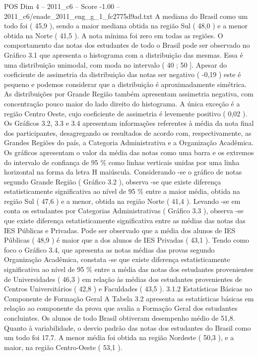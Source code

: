 \begin{textsample}{POS Dim 4 – 2011\_c6 – Score -1.00 – 2011\_c6/enade\_2011\_eng\_g\_1\_fc2775d9ad.txt}
A mediana do Brasil como um todo foi ( 45,9 ), sendo a maior mediana obtida na região Sul ( 48,0 ) e a menor obtida na Norte ( 41,5 ).
A nota mínima foi zero em todas as regiões.
O comportamento das notas dos estudantes de todo o Brasil pode ser observado no Gráfico 3.1 que apresenta o histograma com a distribuição das mesmas.
Essa é uma distribuição unimodal, com moda no intervalo ( 40 ; 50 ].
Apesar do coeficiente de assimetria da distribuição das notas ser negativo ( -0,19 ) este é pequeno e podemos considerar que a distribuição é aproximadamente simétrica.
As distribuições por Grande Região também apresentam assimetria negativa, com concentração pouco maior do lado direito do histograma.
A única exceção é a região Centro Oeste, cujo coeficiente de assimetria é levemente positivo ( 0,02 ).
Os Gráficos 3.2, 3.3 e 3.4 apresentam informações referentes à média da nota final dos participantes, desagregando os resultados de acordo com, respectivamente, as Grandes Regiões do país, a Categoria Administrativa e a Organização Acadêmica.
Os gráficos apresentam o valor da média das notas como uma barra e os extremos do intervalo de confiança de 95 \% como linhas verticais unidas por uma linha horizontal na forma da letra H maiúscula.
Considerando -se o gráfico de notas segundo Grande Região ( Gráfico 3.2 ), observa -se que existe diferença estatisticamente significativa ao nível de 95 \% entre a maior média, obtida na região Sul ( 47,6 ) e a menor, obtida na região Norte ( 41,4 ).
Levando -se em conta os estudantes por Categorias Administrativas ( Gráfico 3.3 ), observa -se que existe diferença estatisticamente significativa entre as médias das notas das IES Públicas e Privadas.
Pode ser observado que a média dos alunos de IES Públicas ( 48,9 ) é maior que a dos alunos de IES Privadas ( 43,1 ).
Tendo como foco o Gráfico 3.4, que apresenta as notas médias das provas segundo Organização Acadêmica, constata -se que existe diferença estatisticamente significativa ao nível de 95 \% entre a média das notas dos estudantes provenientes de Universidades ( 46,3 ) em relação às médias dos estudantes provenientes de Centros Universitários ( 42,8 ) e Faculdades ( 43,5 ). 3.1.2 Estatísticas Básicas no Componente de Formação Geral A Tabela 3.2 apresenta as estatísticas básicas em relação ao componente da prova que avalia a Formação Geral dos estudantes concluintes.
Os alunos de todo Brasil obtiveram desempenho médio de 51,8.
Quanto à variabilidade, o desvio padrão das notas dos estudantes do Brasil como um todo foi 17,7.
A menor média foi obtida na região Nordeste ( 50,3 ), e a maior, na região Centro-Oeste ( 53,1 ).

\end{textsample}

